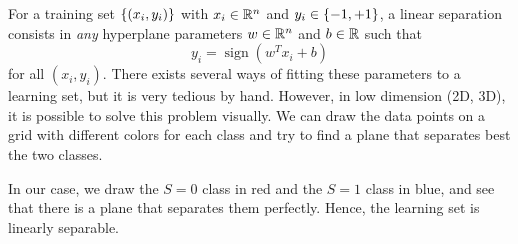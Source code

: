 \documentclass[11pt, a4paper]{article}
\begin{document}
\begin{enumerate}
    \begin{solution}
        For a training set $\{(x_i, y_i)\}$ with $x_i \in \mathbb{R}^n$ and $y_i \in \{-1, +1\}$, a linear separation consists in \emph{any} hyperplane parameters $w \in \mathbb{R}^n$ and $b \in \mathbb{R}$ such that
        \begin{equation*}
            y_i = \operatorname{sign}(w^T x_i + b)
        \end{equation*}
        for all $(x_i, y_i)$. There exists several ways of fitting these parameters to a learning set, but it is very tedious by hand. However, in low dimension (2D, 3D), it is possible to solve this problem visually. We can draw the data points on a grid with different colors for each class and try to find a plane that separates best the two classes.

        In our case, we draw the $S = 0$ class in red and the $S = 1$ class in blue, and see that there is a plane that separates them perfectly. Hence, the learning set is linearly separable.

        \begin{figure}[h]
            \centering

\end{figure}
\end{solution}
\end{enumerate}
\end{document}
